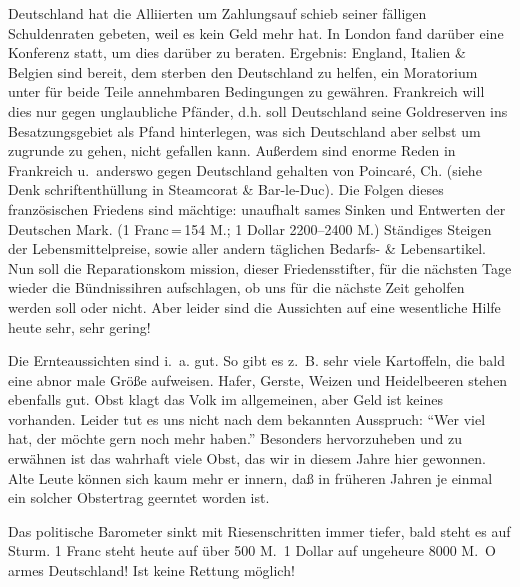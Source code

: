 

%
Deutschland hat die Alliierten um Zahlungsauf\ohb
schieb seiner fälligen Schuldenraten gebeten, weil es\ob
kein Geld mehr hat. In London fand darüber eine\ob
Konferenz statt, um dies darüber zu beraten. Ergebnis:\ob
England, Italien \& Belgien sind bereit, dem sterben\ohb
den Deutschland zu helfen, ein Moratorium unter\ob
für beide Teile annehmbaren Bedingungen zu gewähren.\ob
Frankreich will dies nur gegen unglaubliche Pfänder,\ob
d.h. soll Deutschland seine Goldreserven ins Besatzungsgebiet\ob
als Pfand hinterlegen, was sich Deutschland aber selbst\ob
um zugrunde zu gehen, nicht gefallen kann. Außerdem\ob
sind enorme Reden in Frankreich u.\ anderswo gegen\ob
Deutschland gehalten von Poincaré, Ch. (siehe Denk\ohb
schriftenthüllung in Steamcorat \& Bar-le-Duc). Die Folgen\ob
dieses französischen Friedens sind mächtige: unaufhalt\ohb
sames Sinken und Entwerten der Deutschen Mark.\ob
(1 Franc\,=\,154 M.; 1 Dollar 2200--2400 M.) Ständiges Steigen\ob
der Lebensmittelpreise, sowie aller andern täglichen\ob
Bedarfs- \& Lebensartikel. Nun soll die Reparationskom\ohb
mission, dieser Friedensstifter, für die nächsten Tage\ob
wieder die Bündnissihren aufschlagen, ob uns für die\ob
nächste Zeit geholfen werden soll oder nicht. Aber leider\ob
sind die Aussichten auf eine wesentliche Hilfe heute\ob
sehr, sehr gering!

Die Ernteaussichten sind i.\ a. gut. So\ob
gibt es z.\ B. sehr viele Kartoffeln, die bald eine abnor\ohb
male Größe aufweisen. Hafer, Gerste, Weizen und\ob
Heidelbeeren stehen ebenfalls gut. Obst klagt das Volk\ob
im allgemeinen, aber Geld ist keines vorhanden.\ob
Leider tut es uns nicht nach dem bekannten Ausspruch:\ob
\enquote{Wer viel hat, der möchte gern noch mehr haben.}\ob
Besonders hervorzuheben und zu erwähnen ist das\ob
wahrhaft viele Obst, das wir in diesem Jahre hier\ob
gewonnen. Alte Leute können sich kaum mehr er\ohb
innern, daß in früheren Jahren je einmal ein\ob
solcher Obstertrag geerntet worden ist.

%
Das politische Barometer sinkt mit Riesenschritten\ob
immer tiefer, bald steht es auf Sturm. 1 Franc steht\ob
heute auf über 500 M.\ 1 Dollar auf ungeheure 8000 M.\ O\ob
armes Deutschland! Ist keine Rettung möglich!
\pend
